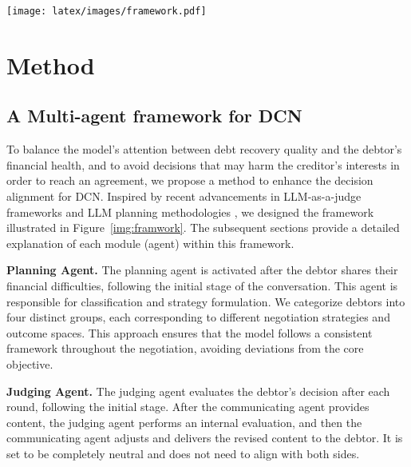 \begin{figure*}[t]
\vspace{-0.35in}
  \centering
  \texttt{[image: latex/images/framework.pdf]}  
\vspace{-0.1in}
  \caption{MADeN Framework overview.}
\vspace{-0.1in}
\label{img:framwork}
\end{figure*}

\section{Method} \label{sec:method}


\subsection{A Multi-agent framework for DCN}\label{sec:framework}

To balance the model’s attention between debt recovery quality and the debtor’s financial health, and to avoid decisions that may harm the creditor’s interests in order to reach an agreement, we propose a method to enhance the decision alignment for DCN. Inspired by recent advancements in LLM-as-a-judge frameworks \citep{NEURIPS2023_91f18a12} and LLM planning methodologies \citep{Kannan2023SMARTLLMSM}, we designed the framework illustrated in Figure~\ref{img:framwork}. The subsequent sections provide a detailed explanation of each module (agent) within this framework.


\textbf{Planning Agent.} The planning agent is activated after the debtor shares their financial difficulties, following the initial stage of the conversation. This agent is responsible for classification and strategy formulation. We categorize debtors into four distinct groups, each corresponding to different negotiation strategies and outcome spaces. This approach ensures that the model follows a consistent framework throughout the negotiation, avoiding deviations from the core objective. 

\textbf{Judging Agent.} The judging agent evaluates the debtor’s decision after each round, following the initial stage. After the communicating agent provides content, the judging agent performs an internal evaluation, and then the communicating agent adjusts and delivers the revised content to the debtor. It is set to be completely neutral and does not need to align with both sides.

